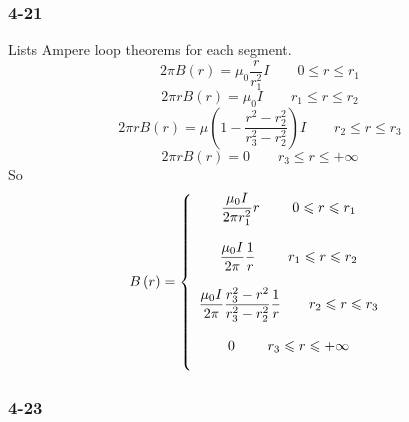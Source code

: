 \documentclass[a4paper,11pt]{amsart}
\theoremstyle{definition}
\begin{document}
	\subsubsection*{4-21}
	Lists Ampere loop theorems for each segment.
	$$
	2\pi B(r)=\mu_0\dfrac{r}{r_1^2}I\qquad0\leqslant r\leqslant r_1
	$$	
	$$
	2\pi rB\left( r \right) =\mu _0I\qquad r_1\leqslant r\leqslant r_2
	$$
	$$
	2\pi rB\left( r \right) =\mu \left( 1-\frac{r^2-r_{2}^{2}}{r_{3}^{2}-r_{2}^{2}} \right) I\qquad r_2\leqslant r\leqslant r_3
	$$
	$$
	2\pi rB\left( r \right) =0\qquad r_3\leqslant r\leqslant +\infty 
	$$
	So
	$$
	B\left( r \right) =\left\{ \begin{array}{c}
		\dfrac{\mu _0I}{2\pi r_{1}^{2}}r\qquad \,\,        0\leqslant r\leqslant r_1\\\\
		\dfrac{\mu _0I}{2\pi}\dfrac{1}{r}\qquad \,\,         r_1\leqslant r\leqslant r_2\\\\
		\dfrac{\mu _0I}{2\pi}\dfrac{r_{3}^{2}-r^2}{r_{3}^{2}-r_{2}^{2}}\dfrac{1}{r}\qquad r_2\leqslant r\leqslant r_3\\\\
		0\qquad \,\,                    r_3\leqslant r\leqslant +\infty\\\\
	\end{array} \right. 
	\\	
	$$
	\subsubsection*{4-23}
\end{document}
